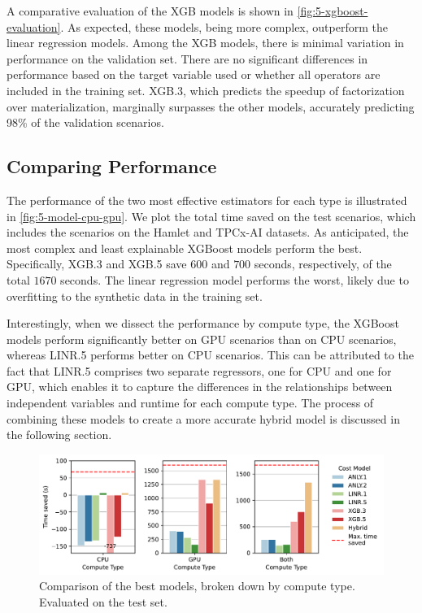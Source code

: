 A comparative evaluation of the XGB models is shown in \autoref{fig:5-xgboost-evaluation}. As expected, these models, being more complex, outperform the linear regression models. Among the XGB models, there is minimal variation in performance on the validation set. There are no significant differences in performance based on the target variable used or whether all operators are included in the training set. XGB.3, which predicts the speedup of factorization over materialization, marginally surpasses the other models, accurately predicting 98\% of the validation scenarios.

\subsection{Comparing Performance}
\label{subsec:5-comparing-performance}
The performance of the two most effective estimators for each type is illustrated in \autoref{fig:5-model-cpu-gpu}. We plot the total time saved on the test scenarios, which includes the scenarios on the Hamlet and TPCx-AI datasets. As anticipated, the most complex and least explainable XGBoost models perform the best. Specifically, XGB.3 and XGB.5 save $600$ and $700$ seconds, respectively, of the total $1670$ seconds. The linear regression model performs the worst, likely due to overfitting to the synthetic data in the training set.

Interestingly, when we dissect the performance by compute type, the XGBoost models perform significantly better on GPU scenarios than on CPU scenarios, whereas LINR.5 performs better on CPU scenarios. This can be attributed to the fact that LINR.5 comprises two separate regressors, one for CPU and one for GPU, which enables it to capture the differences in the relationships between independent variables and runtime for each compute type. The process of combining these models to create a more accurate hybrid model is discussed in the following section.

\begin{figure}[ht]
    \centering
    \includegraphics[width=0.9\linewidth]{chapters/05_cost_estimation/figures/compare_gpu_vs_cpu.pdf}
    \caption[Cost Model Comparison Broken Down by Compute Type]{Comparison of the best models, broken down by compute type. Evaluated on the test set.}
    \label{fig:5-model-cpu-gpu}
\end{figure}

